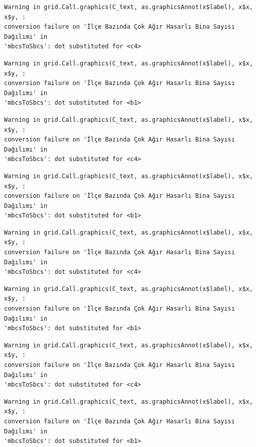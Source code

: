 \documentclass[
  11pt,
  a4paper,
  DIV=11,
  numbers=noendperiod]{scrartcl}
\begin{document}
\begin{verbatim}
Warning in grid.Call.graphics(C_text, as.graphicsAnnot(x$label), x$x, x$y, :
conversion failure on 'İlçe Bazında Çok Ağır Hasarlı Bina Sayısı Dağılımı' in
'mbcsToSbcs': dot substituted for <c4>
\end{verbatim}

\begin{verbatim}
Warning in grid.Call.graphics(C_text, as.graphicsAnnot(x$label), x$x, x$y, :
conversion failure on 'İlçe Bazında Çok Ağır Hasarlı Bina Sayısı Dağılımı' in
'mbcsToSbcs': dot substituted for <b1>
\end{verbatim}

\begin{verbatim}
Warning in grid.Call.graphics(C_text, as.graphicsAnnot(x$label), x$x, x$y, :
conversion failure on 'İlçe Bazında Çok Ağır Hasarlı Bina Sayısı Dağılımı' in
'mbcsToSbcs': dot substituted for <c4>
\end{verbatim}

\begin{verbatim}
Warning in grid.Call.graphics(C_text, as.graphicsAnnot(x$label), x$x, x$y, :
conversion failure on 'İlçe Bazında Çok Ağır Hasarlı Bina Sayısı Dağılımı' in
'mbcsToSbcs': dot substituted for <b1>
\end{verbatim}

\begin{verbatim}
Warning in grid.Call.graphics(C_text, as.graphicsAnnot(x$label), x$x, x$y, :
conversion failure on 'İlçe Bazında Çok Ağır Hasarlı Bina Sayısı Dağılımı' in
'mbcsToSbcs': dot substituted for <c4>
\end{verbatim}

\begin{verbatim}
Warning in grid.Call.graphics(C_text, as.graphicsAnnot(x$label), x$x, x$y, :
conversion failure on 'İlçe Bazında Çok Ağır Hasarlı Bina Sayısı Dağılımı' in
'mbcsToSbcs': dot substituted for <b1>
\end{verbatim}

\begin{verbatim}
Warning in grid.Call.graphics(C_text, as.graphicsAnnot(x$label), x$x, x$y, :
conversion failure on 'İlçe Bazında Çok Ağır Hasarlı Bina Sayısı Dağılımı' in
'mbcsToSbcs': dot substituted for <c4>
\end{verbatim}

\begin{verbatim}
Warning in grid.Call.graphics(C_text, as.graphicsAnnot(x$label), x$x, x$y, :
conversion failure on 'İlçe Bazında Çok Ağır Hasarlı Bina Sayısı Dağılımı' in
'mbcsToSbcs': dot substituted for <b1>
\end{verbatim}
\end{document}
